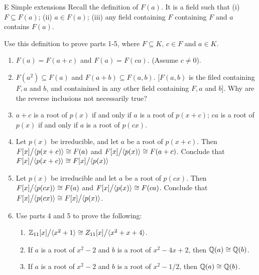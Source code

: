 \begin{exercise}{E Simple extensions}
Recall the definition of $F(a)$. It is a field such that (i) $F\subseteq F(a)$; (ii) $a\in F(a)$; (iii) any field containing $F$ containing $F$ and $a$ contains $F(a)$.

Use this definition to prove parts 1-5, where $F\subseteq K,\, c\in F$ and $a\in K$.
\begin{enumerate}
    \item $F(a)=F(a+c)$ and $F(a)=F(ca)$. (Assume $c\neq 0$).
    \item $F(a^2)\subseteq F(a)$ and $F(a+b)\subseteq F(a,b)$. [$F(a,b)$ is the filed containing $F,a$ and $b$, and containined in any other field containing $F,a$ and $b$]. Why are the reverse inclusions not necessarily true?
    \item $a+c$ is a root of $p(x)$ if and only if $a$ is a root of $p(x+c)$; $ca$ is a root of $p(x)$ if and only if $a$ is a root of $p(cx)$.
    \item Let $p(x)$ be irreducible, and let $a$ be a root of $p(x+c)$. Then ${\textstyle F[x]}\big/{\textstyle \langle p(x+c)\rangle}\cong F(a)$ and ${\textstyle F[x]}\big/{\textstyle \langle p(x)\rangle}\cong F(a+c)$. Conclude that ${\textstyle F[x]}\big/{\textstyle \langle p(x+c)\rangle}\cong{\textstyle F[x]}\big/{\textstyle \langle p(x)\rangle}$
    \item Let $p(x)$ be irreducible and let $a$ be a root of $p(cx)$. Then ${\textstyle F[x]}\big/{\textstyle \langle p(cx)\rangle}\cong F(a)$ and ${\textstyle F[x]}\big/{\textstyle \langle p(x)\rangle}\cong F(ca)$. Conclude that ${\textstyle F[x]}\big/{\textstyle \langle p(cx)\rangle}\cong{\textstyle F[x]}\big/{\textstyle \langle p(x)\rangle}$.
    \item Use parts 4 and 5 to prove the following:
        \begin{enumerate}
            \item ${\textstyle \mathbb{Z}_{11}[x]}\big/{\textstyle \langle x^2+1\rangle}\cong{\textstyle Z_{11}[x]}\big/{\textstyle \langle x^2+x+4\rangle}$.
            \item If $a$ is a root of $x^2-2$ and $b$ is a root of $x^2-4x+2$, then $\mathbb{Q}(a)\cong\mathbb{Q}(b)$.
            \item If $a$ is a root of $x^2-2$ and $b$ is a root of $x^2-1/2$, then $\mathbb{Q}(a)\cong\mathbb{Q}(b)$.
        \end{enumerate}
\end{enumerate}
\end{exercise}
